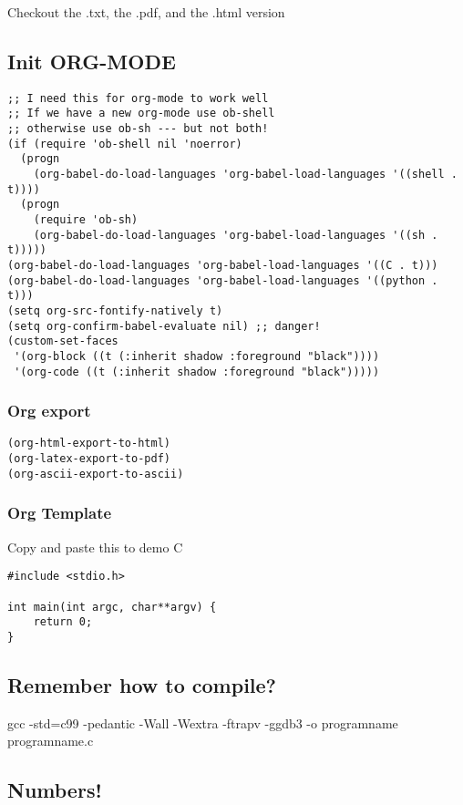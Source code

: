 \documentclass[11pt]{article}
\begin{document}
Checkout the .txt, the .pdf, and the .html version

\subsection{Init ORG-MODE}
\label{sec:orgc8a7168}

\begin{verbatim}
;; I need this for org-mode to work well
;; If we have a new org-mode use ob-shell
;; otherwise use ob-sh --- but not both!
(if (require 'ob-shell nil 'noerror)
  (progn
    (org-babel-do-load-languages 'org-babel-load-languages '((shell . t))))
  (progn
    (require 'ob-sh)
    (org-babel-do-load-languages 'org-babel-load-languages '((sh . t)))))
(org-babel-do-load-languages 'org-babel-load-languages '((C . t)))
(org-babel-do-load-languages 'org-babel-load-languages '((python . t)))
(setq org-src-fontify-natively t)
(setq org-confirm-babel-evaluate nil) ;; danger!
(custom-set-faces
 '(org-block ((t (:inherit shadow :foreground "black"))))
 '(org-code ((t (:inherit shadow :foreground "black")))))
\end{verbatim}

\subsubsection{Org export}
\label{sec:org4aee5be}
\begin{verbatim}
(org-html-export-to-html)
(org-latex-export-to-pdf)
(org-ascii-export-to-ascii)
\end{verbatim}


\subsubsection{Org Template}
\label{sec:org00c0763}
Copy and paste this to demo C

\begin{verbatim}
#include <stdio.h>

int main(int argc, char**argv) {
    return 0;
}
\end{verbatim}

\subsection{Remember how to compile?}
\label{sec:org40fa570}

gcc  -std=c99 -pedantic -Wall -Wextra -ftrapv -ggdb3 -o programname programname.c

\subsection{Numbers!}
\label{sec:org0fc184d}
\end{document}
